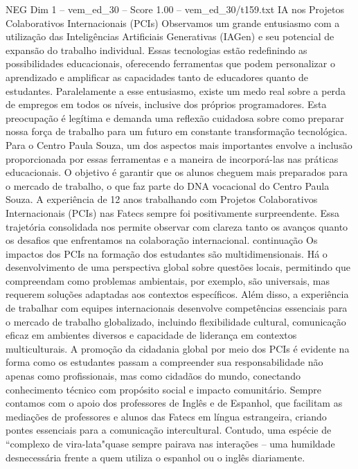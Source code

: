\begin{textsample}{NEG Dim 1 – vem\_ed\_30 – Score 1.00 – vem\_ed\_30/t159.txt}  \label{ex:f1_neg_030}
IA nos Projetos Colaborativos Internacionais (PCIs) Observamos um grande entusiasmo com a utilização das Inteligências Artificiais Generativas (IAGen) e seu potencial de expansão do trabalho individual.
Essas tecnologias estão redefinindo as possibilidades educacionais, oferecendo ferramentas que podem personalizar o aprendizado e amplificar as capacidades tanto de educadores quanto de estudantes.
Paralelamente a esse entusiasmo, existe um medo real sobre a perda de empregos em todos os níveis, inclusive dos próprios programadores.
Esta preocupação é legítima e demanda uma reflexão cuidadosa sobre como preparar nossa força de trabalho para um futuro em constante transformação tecnológica.
Para o Centro Paula Souza, um dos aspectos mais importantes envolve a inclusão proporcionada por essas ferramentas e a maneira de incorporá-las nas práticas educacionais.
O objetivo é garantir que os alunos cheguem mais preparados para o mercado de trabalho, o que faz parte do DNA vocacional do Centro Paula Souza.
A experiência de 12 anos trabalhando com Projetos Colaborativos Internacionais (PCIs) nas Fatecs sempre foi positivamente surpreendente.
Essa trajetória consolidada nos permite observar com clareza tanto os avanços quanto os desafios que enfrentamos na colaboração internacional. continuação Os impactos dos PCIs na formação dos estudantes são multidimensionais.
Há o desenvolvimento de uma perspectiva global sobre questões locais, permitindo que compreendam como problemas ambientais, por exemplo, são universais, mas requerem soluções adaptadas aos contextos específicos.
Além disso, a experiência de trabalhar com equipes internacionais desenvolve competências essenciais para o mercado de trabalho globalizado, incluindo flexibilidade cultural, comunicação eficaz em ambientes diversos e capacidade de liderança em contextos multiculturais.
A promoção da cidadania global por meio dos PCIs é evidente na forma como os estudantes passam a compreender sua responsabilidade não apenas como profissionais, mas como cidadãos do mundo, conectando conhecimento técnico com propósito social e impacto comunitário.
Sempre contamos com o apoio dos professores de Inglês e de Espanhol, que facilitam as mediações de professores e alunos das Fatecs em língua estrangeira, criando pontes essenciais para a comunicação intercultural.
Contudo, uma espécie de “complexo de vira-lata"quase sempre pairava nas interações – uma humildade desnecessária frente a quem utiliza o espanhol ou o inglês diariamente.

\end{textsample}

